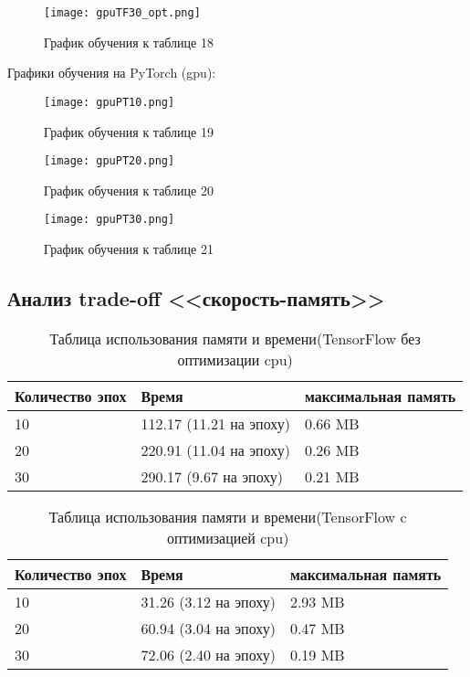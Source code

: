 \documentclass[a4paper,12pt,titlepage,final]{article}
\begin{document}
\begin{figure}[H]
\centering
\texttt{[image: gpuTF30\_opt.png]}
\caption{График обучения к таблице 18}
\label{gputf30_opt}
\end{figure}

\newpage
Графики обучения на PyTorch (gpu):

\begin{figure}[H]
\centering
\texttt{[image: gpuPT10.png]}
\caption{График обучения к таблице 19}
\label{gpupt10}
\end{figure}

\begin{figure}[H]
\centering
\texttt{[image: gpuPT20.png]}
\caption{График обучения к таблице 20}
\label{gpupt20}
\end{figure}

\begin{figure}[H]
\centering
\texttt{[image: gpuPT30.png]}
\caption{График обучения к таблице 21}
\label{gpupt30}
\end{figure}





\begin{center}
    \item \subsection{Анализ trade-off <<скорость-память>>}
\end{center}

\begin{table}[H]
\centering
\begin{tabular}{|p{5.4cm}|p{3.8cm}|p{3.8cm}|}
\hline 
Количество эпох & Время & максимальная память\\ 
\hline
10 & 112.17 (11.21 на эпоху) & 0.66 MB \\ [1.5ex]
\hline
20 & 220.91 (11.04 на эпоху) & 0.26 MB \\ [1.5ex]
\hline
30 & 290.17 (9.67 на эпоху) & 0.21 MB \\ [1.5ex]
\hline
\end{tabular}
\caption{Таблица использования памяти и времени(TensorFlow без оптимизации cpu)}
\label{table_mem1}
\end{table}

\begin{table}[H]
\centering
\begin{tabular}{|p{5.4cm}|p{3.8cm}|p{3.8cm}|}
\hline 
Количество эпох & Время & максимальная память\\ 
\hline
10 & 31.26 (3.12 на эпоху) & 2.93 MB \\ [1.5ex]
\hline
20 & 60.94 (3.04 на эпоху) & 0.47 MB \\ [1.5ex]
\hline
30 & 72.06 (2.40 на эпоху) & 0.19 MB \\ [1.5ex]
\hline
\end{tabular}
\caption{Таблица использования памяти и времени(TensorFlow c оптимизацией cpu)}
\label{table_mem1}
\end{table}
\end{document}
